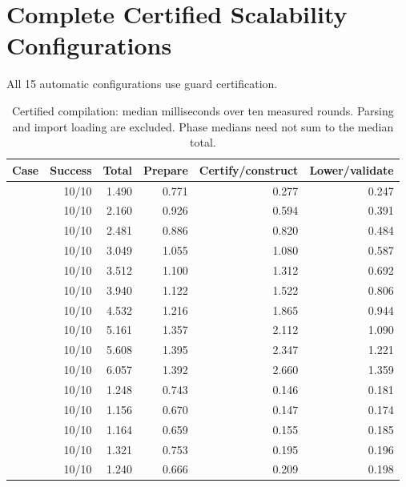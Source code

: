 \section{Complete Certified Scalability Configurations}
All 15 automatic configurations use guard certification.

\begin{table}[!htbp]
\caption{Certified compilation: median milliseconds over ten measured rounds. Parsing and import loading are excluded. Phase medians need not sum to the median total.}
\label{supp-tab:scalability-results}
\small
\begin{tabularx}{\linewidth}{@{}Yrrrrr@{}}\toprule
Case & Success & Total & Prepare & Certify/construct & Lower/validate\\\midrule
{} & 10/10 & 1.490 & 0.771 & 0.277 & 0.247\\
 & 10/10 & 2.160 & 0.926 & 0.594 & 0.391\\
 & 10/10 & 2.481 & 0.886 & 0.820 & 0.484\\
 & 10/10 & 3.049 & 1.055 & 1.080 & 0.587\\
 & 10/10 & 3.512 & 1.100 & 1.312 & 0.692\\
 & 10/10 & 3.940 & 1.122 & 1.522 & 0.806\\
 & 10/10 & 4.532 & 1.216 & 1.865 & 0.944\\
 & 10/10 & 5.161 & 1.357 & 2.112 & 1.090\\
 & 10/10 & 5.608 & 1.395 & 2.347 & 1.221\\
 & 10/10 & 6.057 & 1.392 & 2.660 & 1.359\\
 & 10/10 & 1.248 & 0.743 & 0.146 & 0.181\\
 & 10/10 & 1.156 & 0.670 & 0.147 & 0.174\\
 & 10/10 & 1.164 & 0.659 & 0.155 & 0.185\\
 & 10/10 & 1.321 & 0.753 & 0.195 & 0.196\\
 & 10/10 & 1.240 & 0.666 & 0.209 & 0.198\\
\bottomrule\end{tabularx}
\end{table}
